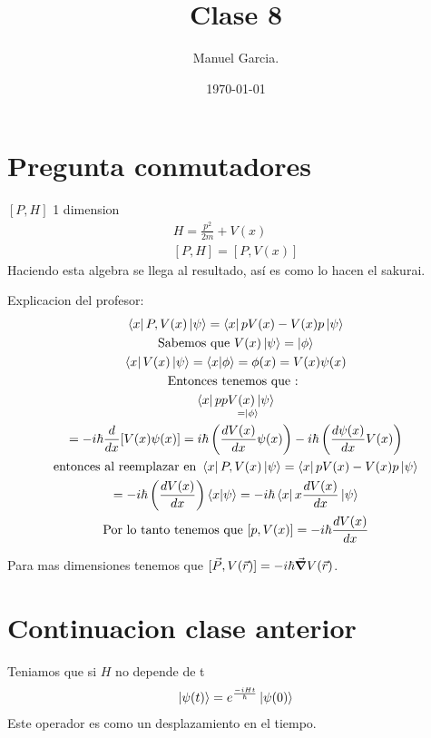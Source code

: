 \documentclass{article}
\title{Clase 8 }
\author{Manuel Garcia.}
\date{\today}
\newcommand{\caja}[3]{%
  \begin{tcolorbox}[colback=#1!5!white,colframe=#1!25!black,title=#2]
    #3
  \end{tcolorbox}%
}
\begin{document}
\maketitle

\section{Pregunta conmutadores}
$ [P,H] $ 1 dimension 
\begin{gather*}
  H = \frac{p ^2 }{2m }+ V(x)\\
  [P,H] = [P, V(x)]
\end{gather*}
Haciendo esta algebra se llega al resultado, así es como lo hacen el sakurai. 

Explicacion del profesor: 
\begin{gather*}
  \bra{x}P,V(x)\ket{\psi} = \bra{x }pV(x)-V(x)p \ket{\psi}  \\
  \text{Sabemos que }V(x)\ket{\psi} = \ket{\phi }\\
  \bra{x }V(x) \ket{\psi} = \bra{x }\ket{\phi }= \phi(x) = V(x)\psi(x)\\
  \text{Entonces tenemos que : }\\
  \bra{x }p \underset{ = \ket{\phi }}{pV(x)\ket{\psi}} \\
  = -i \hbar \frac{d  }{d x }[V(x)\psi(x)] = i \hbar \left(\frac{d V(x) }{d x }\psi(x) \right)- i \hbar \left(\frac{d \psi(x)  }{d x }V(x) \right)\\
  \text{entonces al reemplazar en }  \bra{x}P,V(x)\ket{\psi} = \bra{x }pV(x)-V(x)p \ket{\psi}\\
  = - i \hbar  \left(\frac{d V(x)  }{d x }\right)\bra{x }\ket{\psi} = -i \hbar \bra{x }x \frac{d V(x) }{d x}\ket{\psi}\\
  \text{Por lo tanto tenemos que } [p,V(x)] = - i \hbar \frac{d V(x) }{d x }
\end{gather*}

Para mas dimensiones tenemos que $ [\vec P , V(\vec r )] = -i \hbar \vec \grad V(\vec r ) $. 

\section{Continuacion clase anterior }
\caja{green}{Derivada del operador }{
  Teniamos que si $ H  $ no depende de t 
  \begin{gather*}
    \ket{\psi (t)} = e ^ { \frac{-i H t }{\hbar }}\ket{\psi(0)} 
  \end{gather*}
  Este operador es como un desplazamiento en el tiempo. 
}
\end{document}
